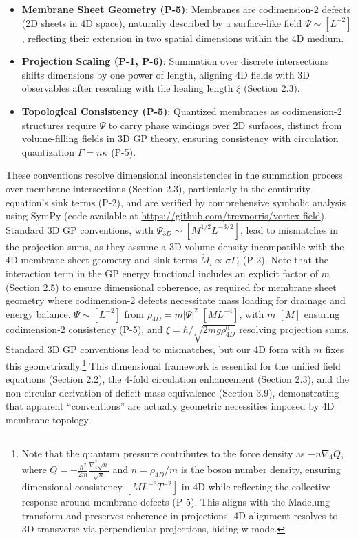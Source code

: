 \begin{itemize}
    \item \textbf{Membrane Sheet Geometry (P-5)}: Membranes are codimension-2 defects (2D sheets in 4D space), naturally described by a surface-like field $\Psi \sim [L^{-2}]$, reflecting their extension in two spatial dimensions within the 4D medium.
    \item \textbf{Projection Scaling (P-1, P-6)}: Summation over discrete intersections shifts dimensions by one power of length, aligning 4D fields with 3D observables after rescaling with the healing length $\xi$ (Section 2.3).
    \item \textbf{Topological Consistency (P-5)}: Quantized membranes as codimension-2 structures require $\Psi$ to carry phase windings over 2D surfaces, distinct from volume-filling fields in 3D GP theory, ensuring consistency with circulation quantization $\Gamma = n \kappa$ (P-5).
\end{itemize}

These conventions resolve dimensional inconsistencies in the summation process over membrane intersections (Section 2.3), particularly in the continuity equation's sink terms (P-2), and are verified by comprehensive symbolic analysis using SymPy (code available at \url{https://github.com/trevnorris/vortex-field}). Standard 3D GP conventions, with $\Psi_{3D} \sim [M^{1/2} L^{-3/2}]$, lead to mismatches in the projection sums, as they assume a 3D volume density incompatible with the 4D membrane sheet geometry and sink terms $\dot{M}_i \propto \sigma \Gamma_i$ (P-2). Note that the interaction term in the GP energy functional includes an explicit factor of $m$ (Section 2.5) to ensure dimensional coherence, as required for membrane sheet geometry where codimension-2 defects necessitate mass loading for drainage and energy balance. $\Psi \sim [L^{-2}]$ from $\rho_{4D} = m |\Psi|^2$ $[M L^{-4}]$, with $m$ $[M]$ ensuring codimension-2 consistency (P-5), and $\xi = \hbar / \sqrt{2 m g \rho_{4D}^0}$ resolving projection sums. Standard 3D GP conventions lead to mismatches, but our 4D form with $m$ fixes this geometrically.\footnote{Note that the quantum pressure contributes to the force density as $-n \nabla_4 Q$, where $Q = -\frac{\hbar^2}{2m} \frac{\nabla_4^2 \sqrt{n}}{\sqrt{n}}$ and $n = \rho_{4D}/m$ is the boson number density, ensuring dimensional consistency $[M L^{-3} T^{-2}]$ in 4D while reflecting the collective response around membrane defects (P-5). This aligns with the Madelung transform and preserves coherence in projections. 4D alignment resolves to 3D transverse via perpendicular projections, hiding w-mode.} This dimensional framework is essential for the unified field equations (Section 2.2), the 4-fold circulation enhancement (Section 2.3), and the non-circular derivation of deficit-mass equivalence (Section 3.9), demonstrating that apparent ``conventions'' are actually geometric necessities imposed by 4D membrane topology.

